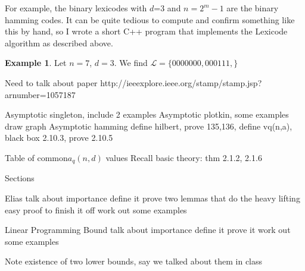 \documentclass{article}
\numberwithin{theorem}{subsection}
\numberwithin{lemma}{subsection}
\theoremstyle{definition}
\newtheorem{exmp}{Example}
\numberwithin{exmp}{subsection}
\theoremstyle{definition}
\numberwithin{defn}{subsection}
\theoremstyle{definition}
\numberwithin{claim}{subsection}
\begin{document}
For example, the binary lexicodes with $d$=3 and $n=2^m-1$ are the binary hamming codes.  It can be quite
tedious to compute and confirm something like this by hand, so I wrote a short C++ program that implements the Lexicode algorithm as described above.  

\begin{exmp}
Let $n=7$, $d=3$.  We find $\mathcal{L}= \{0000000,000111,  \}$
\end{exmp}



Need to talk about paper
http://ieeexplore.ieee.org/stamp/stamp.jsp?arnumber=1057187




Asymptotic singleton, include 2 examples
Asymptotic plotkin, some examples
draw graph
Asymptotic hamming
	define hilbert, prove 135,136, define vq(n,a),
	black box 2.10.3, prove 2.10.5


Table of common$a_q(n,d)$ values
Recall basic theory: thm 2.1.2, 2.1.6

Sections


Elias
talk about importance
define it
prove two lemmas that do the heavy lifting
easy proof to finish it off
work out some examples

Linear Programming Bound
talk about importance
define it
prove it
work out some examples


Note existence of two lower bounds, say we talked about them in class
\end{document}
